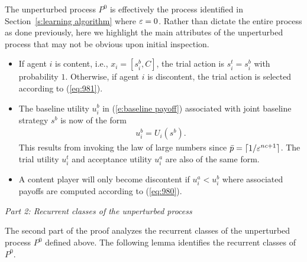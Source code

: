 The unperturbed process $P^0$ is effectively the process identified in Section~\ref{s:learning algorithm} where $\varepsilon = 0$.  Rather than dictate the entire process as done previously, here we highlight the main attributes of the unperturbed process that may not be obvious upon initial inspection.  

\begin{itemize}%
%
\item If agent $i$ is content, i.e., $x_i = [s_i^b, C]$, the trial action is $s_i^t = s_i^b$ with probability $1$. Otherwise, if agent $i$ is discontent, the trial action is selected according to (\ref{eq:981}). 
%
\item The baseline utility $u_i^b$ in (\ref{e:baseline payoff}) associated with joint baseline strategy $s^b$ is now of the form
%
\begin{eqnarray}\label{eq:980}
u_i^b = U_i(s^b) .
\end{eqnarray}
%
This results from invoking the law of large numbers since $\bar{p} = \lceil 1/\varepsilon^{nc+1}\rceil$.  The trial utility $u_i^t$ and acceptance utility $u_i^a$ are also of the same form.  
%
\item A content player will only become discontent if $u_i^a < u_i^b$ where associated payoffs are computed according to (\ref{eq:980}).
%
\end{itemize}

\vspace{.2cm}
\noindent \emph{Part 2: Recurrent classes of the unperturbed process}
\vspace{.2cm}

The second part of the proof analyzes the recurrent classes of the unperturbed process $P^0$ defined above.  The following lemma identifies the recurrent classes of $P^0$.  

